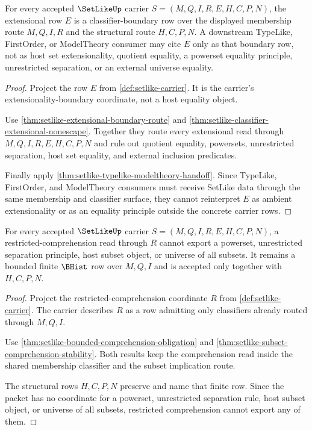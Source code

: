 \begin{theorem}
\label{thm:setlike-extensionality-refusal-obligation}
For every accepted $\SetLikeUp$ carrier $S=(M,Q,I,R,E,H,C,P,N)$, the extensional row $E$ is a classifier-boundary row over the displayed membership route $M,Q,I,R$ and the structural route $H,C,P,N$. A downstream TypeLike, FirstOrder, or ModelTheory consumer may cite $E$ only as that boundary row, not as host set extensionality, quotient equality, a powerset equality principle, unrestricted separation, or an external universe equality.
\end{theorem}
\begin{proof}
Project the row $E$ from \autoref{def:setlike-carrier}. It is the carrier's extensionality-boundary coordinate, not a host equality object.

Use \autoref{thm:setlike-extensional-boundary-route} and \autoref{thm:setlike-classifier-extensional-nonescape}. Together they route every extensional read through $M,Q,I,R,E,H,C,P,N$ and rule out quotient equality, powersets, unrestricted separation, host set equality, and external inclusion predicates.

Finally apply \autoref{thm:setlike-typelike-modeltheory-handoff}. Since TypeLike, FirstOrder, and ModelTheory consumers must receive SetLike data through the same membership and classifier surface, they cannot reinterpret $E$ as ambient extensionality or as an equality principle outside the concrete carrier rows.
\end{proof}

\begin{theorem}
\label{thm:setlike-bounded-comprehension-nonescape}
For every accepted $\SetLikeUp$ carrier $S=(M,Q,I,R,E,H,C,P,N)$, a restricted-comprehension read through $R$ cannot export a powerset, unrestricted separation principle, host subset object, or universe of all subsets. It remains a bounded finite $\BHist$ row over $M,Q,I$ and is accepted only together with $H,C,P,N$.
\end{theorem}
\begin{proof}
Project the restricted-comprehension coordinate $R$ from \autoref{def:setlike-carrier}. The carrier describes $R$ as a row admitting only classifiers already routed through $M,Q,I$.

Use \autoref{thm:setlike-bounded-comprehension-obligation} and \autoref{thm:setlike-subset-comprehension-stability}. Both results keep the comprehension read inside the shared membership classifier and the subset implication route.

The structural rows $H,C,P,N$ preserve and name that finite row. Since the packet has no coordinate for a powerset, unrestricted separation rule, host subset object, or universe of all subsets, restricted comprehension cannot export any of them.
\end{proof}

